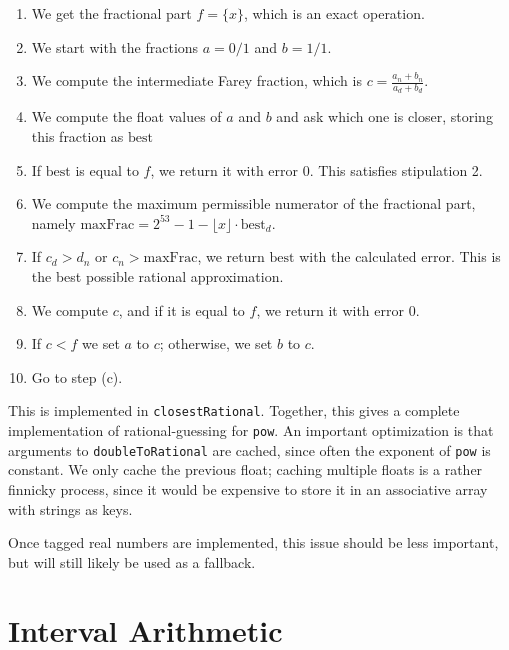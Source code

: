 \documentclass{article}
\begin{document}
\begin{enumerate}[label=(\alph*)]
\item We get the fractional part $f = \{ x \}$, which is an exact operation.
\item We start with the fractions $a=0/1$ and $b=1/1$.
\item We compute the intermediate Farey fraction, which is $c=\frac{a_n+b_n}{a_d+b_d}$.
\item We compute the float values of $a$ and $b$ and ask which one is closer, storing this fraction as $\text{best}$
\item If $\text{best}$ is equal to $f$, we return it with error $0$. This satisfies stipulation 2.
\item We compute the maximum permissible numerator of the fractional part, namely $\text{maxFrac}=2^{53} - 1 - \lfloor x \rfloor \cdot \text{best}_d$.
\item If $c_d > d_n$ or $c_n > \text{maxFrac}$, we return $\text{best}$ with the calculated error. This is the best possible rational approximation.
\item We compute $c$, and if it is equal to $f$, we return it with error $0$.
\item If $c < f$ we set $a$ to $c$; otherwise, we set $b$ to $c$.
\item Go to step (c).
\end{enumerate}

This is implemented in \texttt{closestRational}. Together, this gives a complete implementation of rational-guessing for \texttt{pow}. An important optimization is that arguments to \texttt{doubleToRational} are cached, since often the exponent of \texttt{pow} is constant. We only cache the previous float; caching multiple floats is a rather finnicky process, since it would be expensive to store it in an associative array with strings as keys.

Once tagged real numbers are implemented, this issue should be less important, but will still likely be used as a fallback.

\section{Interval Arithmetic}
\end{document}
